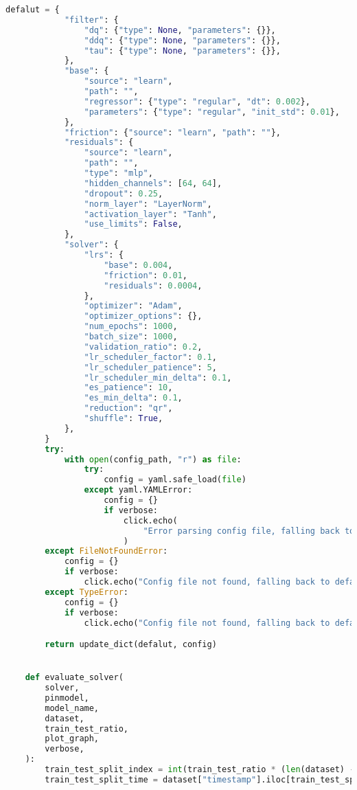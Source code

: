 \begin{lstlisting}[language=python, caption=\raggedright{identification/full.py}, frame=single]
        defalut = {
            "filter": {
                "dq": {"type": None, "parameters": {}},
                "ddq": {"type": None, "parameters": {}},
                "tau": {"type": None, "parameters": {}},
            },
            "base": {
                "source": "learn",
                "path": "",
                "regressor": {"type": "regular", "dt": 0.002},
                "parameters": {"type": "regular", "init_std": 0.01},
            },
            "friction": {"source": "learn", "path": ""},
            "residuals": {
                "source": "learn",
                "path": "",
                "type": "mlp",
                "hidden_channels": [64, 64],
                "dropout": 0.25,
                "norm_layer": "LayerNorm",
                "activation_layer": "Tanh",
                "use_limits": False,
            },
            "solver": {
                "lrs": {
                    "base": 0.004,
                    "friction": 0.01,
                    "residuals": 0.0004,
                },
                "optimizer": "Adam",
                "optimizer_options": {},
                "num_epochs": 1000,
                "batch_size": 1000,
                "validation_ratio": 0.2,
                "lr_scheduler_factor": 0.1,
                "lr_scheduler_patience": 5,
                "lr_scheduler_min_delta": 0.1,
                "es_patience": 10,
                "es_min_delta": 0.1,
                "reduction": "qr",
                "shuffle": True,
            },
        }
        try:
            with open(config_path, "r") as file:
                try:
                    config = yaml.safe_load(file)
                except yaml.YAMLError:
                    config = {}
                    if verbose:
                        click.echo(
                            "Error parsing config file, falling back to default"
                        )
        except FileNotFoundError:
            config = {}
            if verbose:
                click.echo("Config file not found, falling back to default")
        except TypeError:
            config = {}
            if verbose:
                click.echo("Config file not found, falling back to default")

        return update_dict(defalut, config)


    def evaluate_solver(
        solver,
        pinmodel,
        model_name,
        dataset,
        train_test_ratio,
        plot_graph,
        verbose,
    ):
        train_test_split_index = int(train_test_ratio * (len(dataset) - 1))
        train_test_split_time = dataset["timestamp"].iloc[train_test_split_index]


\end{lstlisting}
